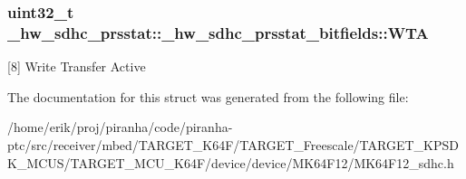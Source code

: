\subsubsection[{\texorpdfstring{W\+TA}{WTA}}]{\setlength{\rightskip}{0pt plus 5cm}uint32\+\_\+t \+\_\+hw\+\_\+sdhc\+\_\+prsstat\+::\+\_\+hw\+\_\+sdhc\+\_\+prsstat\+\_\+bitfields\+::\+W\+TA}\hypertarget{struct__hw__sdhc__prsstat_1_1__hw__sdhc__prsstat__bitfields_aacc7b3355c4cde6d6e24e160dee7a0a9}{}\label{struct__hw__sdhc__prsstat_1_1__hw__sdhc__prsstat__bitfields_aacc7b3355c4cde6d6e24e160dee7a0a9}
\mbox{[}8\mbox{]} Write Transfer Active 

The documentation for this struct was generated from the following file\+:\begin{DoxyCompactItemize}
\item 
/home/erik/proj/piranha/code/piranha-\/ptc/src/receiver/mbed/\+T\+A\+R\+G\+E\+T\+\_\+\+K64\+F/\+T\+A\+R\+G\+E\+T\+\_\+\+Freescale/\+T\+A\+R\+G\+E\+T\+\_\+\+K\+P\+S\+D\+K\+\_\+\+M\+C\+U\+S/\+T\+A\+R\+G\+E\+T\+\_\+\+M\+C\+U\+\_\+\+K64\+F/device/device/\+M\+K64\+F12/M\+K64\+F12\+\_\+sdhc.\+h\end{DoxyCompactItemize}
